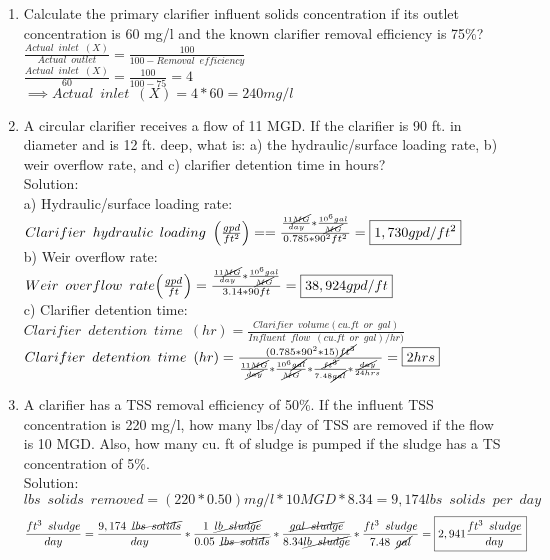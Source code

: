 \begin{enumerate}
\item Calculate the primary clarifier influent solids concentration if its outlet concentration is 60 mg/l and the known clarifier removal efficiency is 75\%?\\
$\frac{Actual \enspace  inlet \enspace (X)}{Actual \enspace outlet}=\frac{100}{100-Removal \enspace efficiency}$\\ 
$\frac{Actual \enspace  inlet \enspace (X)}{60}=\frac{100}{100-75}=4$\\
$\implies Actual \enspace inlet \enspace (X)=4*60 = \boxed{240 mg/l}$\\

\item A circular clarifier receives a flow of 11 MGD.  If the clarifier is 90 ft. in diameter and is 12 ft. deep, what is: a) the hydraulic/surface loading rate, b) weir overflow rate, and c) clarifier detention time in hours?\\
Solution:\\
a) Hydraulic/surface loading rate:\\
$Clarifier \enspace hydraulic \enspace loading \enspace 	\Big(\frac{gpd}{ft^2}\Big) ==\frac{\frac{11\cancel{MG}}{{day}}*\frac{10^6gal}{\cancel{MG}}}{0.785*90^2 ft^2}=\boxed{1,730gpd/ft^2}$\\
b) Weir overflow rate:\\ 
$Weir \enspace overflow \enspace rate \Big(\frac{gpd}{ft}\Big) =\frac{\frac{11\cancel{MG}}{{day}}*\frac{10^6gal}{\cancel{MG}}}{3.14*90 ft}=\boxed{38,924gpd/ft}$\\
c) Clarifier detention time:\\
$Clarifier \enspace detention \enspace time \enspace (hr) = 	\frac{ Clarifier \enspace volume (cu.ft \enspace or \enspace gal)}{Influent \enspace flow \enspace (cu.ft \enspace or \enspace gal)/hr)}$\\
$Clarifier \enspace detention \enspace time \enspace (hr) = 	\frac{(0.785*90^2*15)\cancel{ft^3}}{\frac{11\cancel{MG}}{\cancel{day}}*\frac{10^6\cancel{gal}}{\cancel{MG}}*\frac{\cancel{ft^3}}{7.48\cancel{gal}}*\frac{\cancel{day}}{24hrs}}=\boxed{2hrs}$\\
\vspace{1cm}
\item A clarifier has a TSS removal efficiency of 50\%.  If the influent TSS concentration is 220 mg/l, how many lbs/day of TSS are removed if the flow is 10 MGD.  Also, how many cu. ft of sludge is pumped if the sludge has a TS concentration of 5\%.\\
Solution:\\
$lbs \enspace solids \enspace removed=(220*0.50)mg/l*10MGD*8.34=9,174lbs \enspace solids \enspace per \enspace day$
$$\frac{ft^3\enspace sludge}{day}= \frac{9,174 \enspace \cancel{lbs \enspace solids}}{day} * \frac{1 \enspace \cancel{lb \enspace sludge}}{0.05\enspace \cancel{lbs \enspace solids}}*\frac{\cancel{gal \enspace sludge}}{8.34\cancel{lb \enspace sludge}}*\frac{ft^3 \enspace sludge}{7.48 \enspace \cancel{gal}}=\boxed{2,941\frac{ft^3 \enspace sludge}{day}} $$


\end{enumerate}
